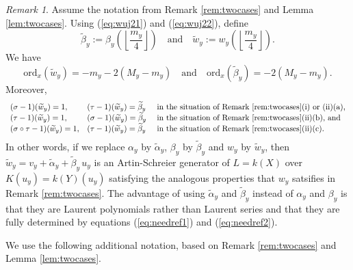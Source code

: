 \documentclass{amsart}
\numberwithin{equation}{section}
\numberwithin{table}{section}
\theoremstyle{plain}
\theoremstyle{definition}
\theoremstyle{remark}
\newtheorem{remark}[theorem]{Remark}
\begin{document}
\begin{remark}
\label{rem:betterwu}
Assume the notation from Remark \ref{rem:twocases} and Lemma \ref{lem:twocases}. Using (\ref{eq:wuj21}) and (\ref{eq:wuj22}), define
\begin{equation}
\label{eq:betterwu}
\widetilde{\beta}_y := \beta_y\left( \textstyle{\left\lfloor\frac{m_y}{4}\right\rfloor} \right) \quad\mbox{and}\quad
\widetilde{w}_y:=w_y\left(\textstyle{\left\lfloor\frac{m_y}{4}\right\rfloor} \right).
\end{equation}
We have
$$\mathrm{ord}_x(\widetilde{w}_y)=-m_y-2(M_y-m_y)\quad\mbox{and}\quad \mathrm{ord}_x(\widetilde{\beta}_y)=-2(M_y-m_y).$$
Moreover,
$$\begin{array}{lll}
(\sigma -1)(\widetilde{w}_y) = 1, & (\tau-1)(\widetilde{w}_y) = \widetilde{\beta}_y &\mbox{ in the situation of Remark \ref{rem:twocases}(i) or (ii)(a),}\\
(\tau-1)(\widetilde{w}_y) = 1, & (\sigma -1)(\widetilde{w}_y) = \widetilde{\beta}_y &\mbox{ in the situation of Remark \ref{rem:twocases}(ii)(b), and}\\
(\sigma\circ\tau -1)(\widetilde{w}_y) = 1, & (\tau -1)(\widetilde{w}_y) = \widetilde{\beta}_y &\mbox{ in the situation of Remark \ref{rem:twocases}(ii)(c).}
\end{array}$$
In other words, if we replace $\alpha_y$ by $\widetilde{\alpha}_y$, $\beta_y$ by $\widetilde{\beta}_y$ and $w_y$ by $\widetilde{w}_y$, then $\widetilde{w}_y=v_y+\widetilde{\alpha}_y+\widetilde{\beta}_y\,u_y$ is an Artin-Schreier generator of $L=k(X)$ over $K(u_y)=k(Y)(u_y)$ satisfying the analogous properties that $w_y$ satsifies in Remark \ref{rem:twocases}. The advantage of using $\widetilde{\alpha}_y$ and $\widetilde{\beta}_y$ instead of $\alpha_y$ and $\beta_y$ is that they are Laurent polynomials rather than Laurent series and that they are fully determined by equations (\ref{eq:needref1}) and (\ref{eq:needref2}).
\end{remark}

We use the following additional notation, based on Remark \ref{rem:twocases} and Lemma \ref{lem:twocases}.
\end{document}
